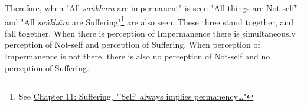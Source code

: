 Therefore, when "All \emph{saṅkhāra} are impermanent" is seen "All things are
Not-self" and "All \emph{saṅkhāra} are Suffering"\footnote{See \hyperlink{ch-11-suffering#impermanent}{Chapter 11: Suffering, "'Self' always implies permanency…​"}} are also seen. These three stand
together, and fall together. When there is perception of Impermanence
there is simultaneously perception of Not-self and perception of
Suffering. When perception of Impermanence is not there, there is also
no perception of Not-self and no perception of Suffering.


